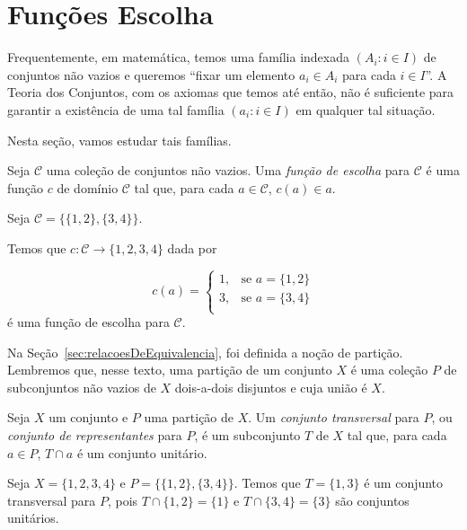 \section{Funções Escolha}\label{sec:funcoesEscolha}

Frequentemente, em matemática, temos uma família indexada $(A_i: i\in I)$ de conjuntos não vazios e queremos ``fixar um elemento $a_i \in A_i$ para cada $i\in I$''.
A Teoria dos Conjuntos, com os axiomas que temos até então, não é suficiente para garantir a existência de uma tal família $(a_i: i\in I)$ em qualquer tal situação.

Nesta seção, vamos estudar tais famílias.

\begin{definition}[$Z^--P$]\label{def:funcaoEscolha}
    Seja $\mathcal C$ uma coleção de conjuntos não vazios.
    Uma \emph{função de escolha} para $\mathcal C$ é uma função $c$ de domínio $\mathcal C$ tal que, para cada $a\in \mathcal C$, $c(a)\in a$.
\end{definition}
\begin{example}[$Z^--P$]
    Seja $\mathcal C=\{\{1, 2\}, \{3, 4\}\}$.

    Temos que $c:\mathcal C\to \{1, 2, 3, 4\}$ dada por

    \[
        c(a) = \begin{cases}
            1, & \text{se } a=\{1, 2\}\\
            3, & \text{se } a=\{3, 4\}\\
        \end{cases}
    \]
    é uma função de escolha para $\mathcal C$.
\end{example}
Na Seção~\ref{sec:relacoesDeEquivalencia}, foi definida a noção de partição.
Lembremos que, nesse texto, uma partição de um conjunto $X$ é uma coleção $P$ de subconjuntos não vazios de $X$ dois-a-dois disjuntos e cuja união é $X$.

\begin{definition}[$Z^--P$]
    Seja $X$ um conjunto e $P$ uma partição de $X$.
    Um \emph{conjunto transversal} para $P$, ou \emph{conjunto de representantes} para $P$, é um subconjunto $T$ de $X$ tal que, para cada $a\in P$, $T\cap a$ é um conjunto unitário.
\end{definition}

\begin{example}[$Z^--P$]
    Seja $X=\{1, 2, 3, 4\}$ e $P=\{\{1, 2\}, \{3, 4\}\}$.
    Temos que $T=\{1, 3\}$ é um conjunto transversal para $P$, pois $T\cap \{1, 2\}=\{1\}$ e $T\cap \{3, 4\}=\{3\}$ são conjuntos unitários.
\end{example}


